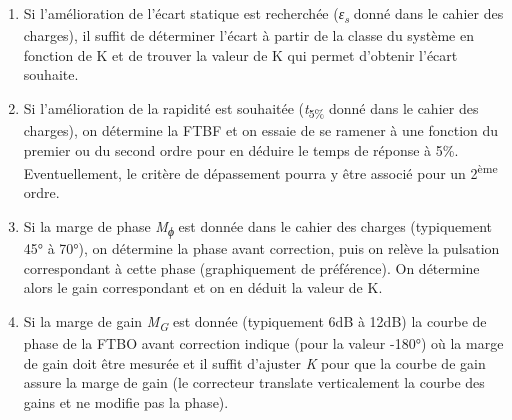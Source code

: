 \begin{enumerate}
\def\labelenumi{\arabic{enumi}.}
\item
  Si l'amélioration de l'écart statique est recherchée (\emph{ε\textsubscript{s}} donné dans le cahier des charges), il suffit de déterminer l'écart à partir de la classe du système en fonction de K et de trouver la valeur de K qui permet d'obtenir l'écart souhaite.
\item
  Si l'amélioration de la rapidité est souhaitée (\emph{t}\textsubscript{5\%} donné dans le cahier des charges), on détermine la FTBF et on essaie de se ramener à une fonction du premier ou du second ordre pour en déduire le temps de réponse à 5\%. Eventuellement, le critère de dépassement pourra y être associé pour un 2\textsuperscript{ème} ordre.
\item
  Si la marge de phase \emph{M\textsubscript{ϕ}} est donnée dans le cahier des charges (typiquement 45° à 70°), on détermine la phase avant correction, puis on relève la pulsation correspondant à cette phase (graphiquement de préférence). On détermine alors le gain correspondant et on en déduit la valeur de K.
\item
  Si la marge de gain \emph{M\textsubscript{G}} est donnée (typiquement 6dB à 12dB) la courbe de phase de la FTBO avant correction indique (pour la valeur -180°) où la marge de gain doit être mesurée et il suffit d'ajuster \emph{K} pour que la courbe de gain assure la marge de gain (le correcteur translate verticalement la courbe des gains et ne modifie pas la phase).
\end{enumerate}


